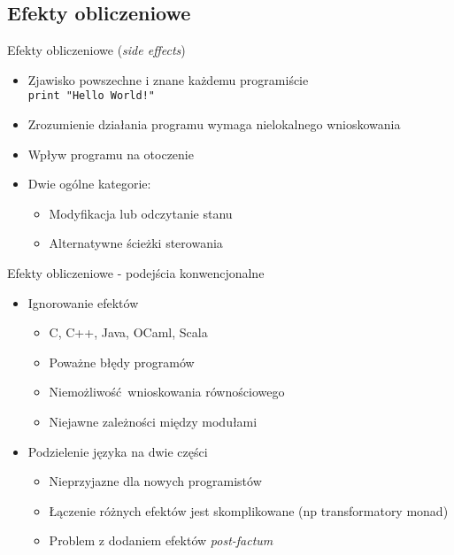 \documentclass{beamer}
\begin{document}
\subsection{Efekty obliczeniowe}
\begin{frame}{Efekty obliczeniowe (\textit{side effects})}
  \begin{itemize}
    \item Zjawisko powszechne i znane każdemu programiście \\
    \texttt{print "Hello World!"}
    \item Zrozumienie działania programu wymaga nielokalnego wnioskowania
    \item Wpływ programu na otoczenie
    \item Dwie ogólne kategorie:
    \begin{itemize}
      \item Modyfikacja lub odczytanie stanu 
      \pause
      \item Alternatywne ścieżki sterowania 
    \end{itemize}
  \end{itemize}
\end{frame}



\begin{frame}{Efekty obliczeniowe - podejścia konwencjonalne}
  \begin{itemize}
    \item Ignorowanie efektów
    \begin{itemize}
      \item C, C++, Java, OCaml, Scala
      \item Poważne błędy programów
      \item Niemożliwość wnioskowania równościowego
      \item Niejawne zależności między modułami
    \end{itemize}
    \pause
    \item Podzielenie języka na dwie części
    \begin{itemize}
      \item Nieprzyjazne dla nowych programistów
      \item Łączenie różnych efektów jest skomplikowane (np transformatory monad)
      \item Problem z dodaniem efektów \textit{post-factum}
    \end{itemize}
  \end{itemize}
\end{frame}
\end{document}
